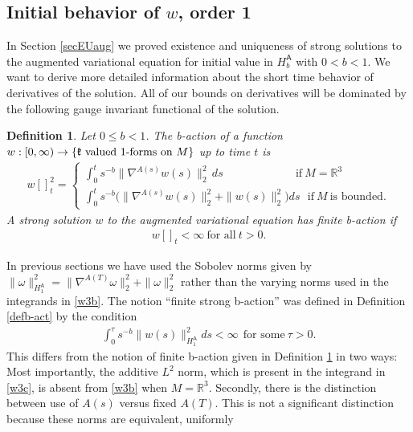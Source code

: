 \documentclass[12pt]{article}
\newtheorem{definition}[theorem]{Definition}
\def \R{\mathbb R}
\def \As{\mathsf{A}}
\def \w{\omega}
\def \kf{\frak k}
\def \nn{[]}
\def \n{\nabla}
\def \eref{\eqref}
\numberwithin{equation}{section}
\begin{document}
\subsection{Initial behavior of $w$,  order 1}     \label{secibw1}



In Section \ref{secEUaug} we proved existence and uniqueness of strong solutions to the augmented variational equation for initial value in $H_b^\As$ with  $0< b <1$.     
We want to derive more detailed information about the short time behavior of 
 derivatives of the solution. All of our bounds on derivatives will be dominated by the following
 gauge invariant functional of the solution.
         \begin{definition}\label{defbac}{\rm 
         Let $0 \le b <1$. The {\it b-action} of a function 
$w:[0,\infty)  
 \rightarrow \{\kf\ \text{valued 1-forms on}\ M\}$ up to time $t$  is
 \begin{align}
  \nn w\nn_t^2=  
  \begin{cases}
   \int_0^t s^{-b}  \|\n^{A(s)} w(s)\|_2^2\,ds \qquad\qquad\qquad\ \ \text{if}\ M = \R^3 \\
   \int_0^t s^{-b} \Big( \|\n^{A(s)} w(s)\|_2^2 + \| w(s)\|_2^2 \Big)ds\ \ \    \text{if}\ M \ \text{is bounded.} \label{w3b}
   \end{cases}
\end{align}
A strong solution $w$ to the augmented variational equation has {\it finite b-action} if 
\begin{align}
\nn w\nn_t < \infty \ \text{for all}\  t >0.     \label{w3d} 
\end{align}
}
\end{definition}
In previous sections we have used the Sobolev norms 
given by $\|\w\|_{H_1^\As}^2 = \| \n^{A(T)} \w\|_2^2 + \| \w\|_2^2$  rather than
 the varying norms used in the integrands in \eref{w3b}. 
 The notion  
 ``finite strong  b-action'' was defined in Definition \ref{defb-act} by the condition 
 \begin{align}
\int_0^\tau s^{-b} \| w(s)\|_{H_1^\As}^2 ds < \infty\ \ \text{for some}\ \tau >0.     \label{w3c}
\end{align}
This differs from the notion of finite b-action given in Definition \ref{defbac} in two ways: 
Most importantly, the additive $L^2$ norm,
which is present in the integrand in \eref{w3c},   
 is absent
from \eref{w3b} when $M = \R^3$. Secondly, there is the distinction between use of 
 $A(s)$
versus fixed $A(T)$. This is not a significant distinction because these norms are equivalent, uniformly
\end{document}
